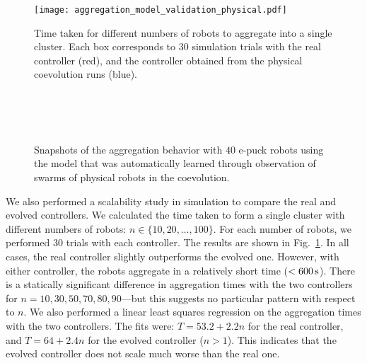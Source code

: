 \begin{figure}[!t]
\centering
\texttt{[image: aggregation\_model\_validation\_physical.pdf]}
\caption{Time taken for different numbers of robots to aggregate into a single cluster. Each box corresponds to $30$ simulation trials with the real controller (red), and the controller obtained from the physical coevolution runs (blue).}
\label{fig:aggregation_model_validation_physical}

\end{figure}

\captionsetup[subfigure]{labelformat=empty}  
\begin{figure*}[!t]
	\centering
	\\
	\\
	\\
	\caption{Snapshots of the aggregation behavior with $40$ e-puck robots using the model that was automatically learned through observation of swarms of physical robots in the coevolution.}
	\label{fig:aggregation_snapshoot_physical_validation}
\end{figure*}

We also performed a scalability study in simulation to compare the real and evolved controllers. We calculated the time taken to form a single cluster with different numbers of robots: $n \in \lbrace10, 20, \dots, 100\rbrace$. For each number of robots, we performed $30$ trials with each controller. The results are shown in Fig.~\ref{fig:aggregation_model_validation_physical}. In all cases, the real controller slightly outperforms the evolved one.
However, with either controller, the robots aggregate in a relatively short time ($<\unit[600]{s}$). There is a statically significant difference in aggregation times with the two controllers for $n= 10, 30, 50, 70, 80, 90$---but this suggests no particular pattern with respect to $n$. We also performed a linear least squares regression on the aggregation times with the two controllers. The fits were: $T = 53.2 + 2.2n$ for the real controller, and $T = 64 + 2.4n$ for the evolved controller ($n>1$). This indicates that the evolved controller does not scale much worse than the real one.

